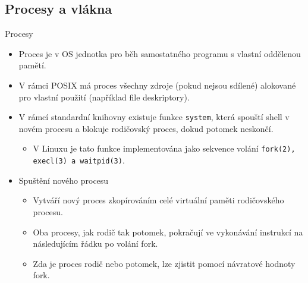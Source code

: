 \documentclass[handout]{beamer}
\begin{document}
\subsection{Procesy a vlákna}
\begin{frame}{Procesy}
    \begin{itemize}
        \item Proces je v OS jednotka pro běh samostatného programu s vlastní oddělenou pamětí.
        \item V rámci POSIX má proces všechny zdroje (pokud nejsou sdílené) alokované pro vlastní použití (například file deskriptory).
        \item V rámcí standardní knihovny existuje funkce \texttt{system}, která spouští shell v novém procesu a blokuje rodičovský proces,
            dokud potomek neskončí.
            \begin{itemize}
                    \item V Linuxu je tato funkce implementována jako sekvence volání \texttt{fork(2), execl(3) a waitpid(3)}.
            \end{itemize}
        \item Spuštění nového procesu 
            \begin{itemize}
                \item Vytváří nový proces zkopírováním celé virtuální paměti rodičovského procesu.
                \item Oba procesy, jak rodič tak potomek, pokračují ve vykonávání instrukcí na následujícím řádku po volání fork.
                \item Zda je proces rodič nebo potomek, lze zjistit pomocí návratové hodnoty fork.
            \end{itemize}

    \end{itemize}
\end{frame}
\end{document}
